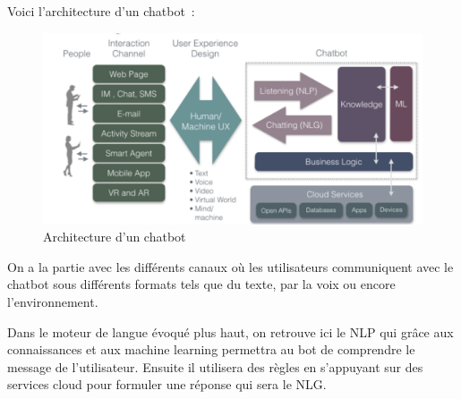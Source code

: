 Voici l’architecture d’un chatbot :
\vspace{1em}

\begin{figure}[H]
	\centering
		\includegraphics[width = \textwidth]{archiBot.png}
	\caption{Architecture d'un chatbot}
	\label{fig:Architecture d'un chatbot}
\end{figure}

On a la partie avec les différents canaux où les utilisateurs communiquent avec le chatbot sous différents formats tels que du texte, par la voix ou encore l’environnement.
\vspace{1em}

Dans le moteur de langue évoqué plus haut, on retrouve ici le NLP qui grâce aux connaissances et aux machine learning permettra au bot de comprendre le message de l’utilisateur. Ensuite il utilisera des règles en s’appuyant sur des services cloud pour formuler une réponse qui sera le NLG.